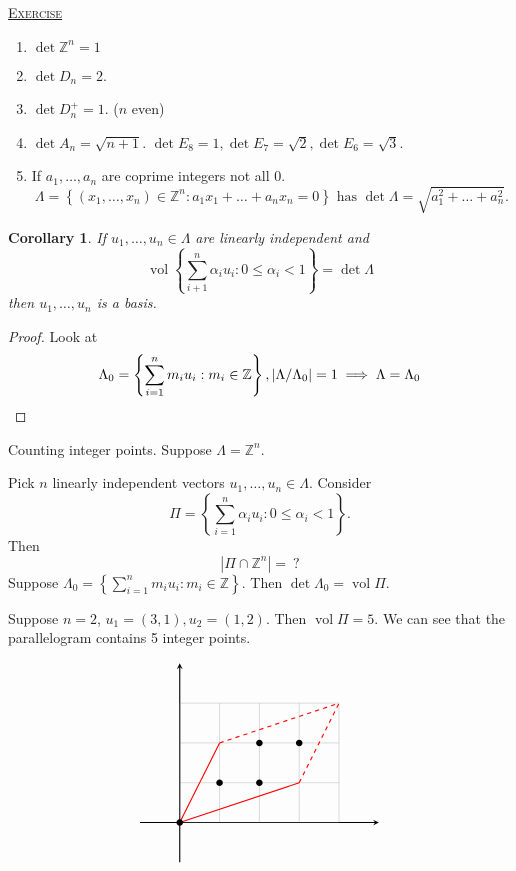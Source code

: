 \documentclass{report}
\newcommand{\Z}{\mathbb{Z}}
\newcommand{\vol}{\operatorname{vol}}
\newcommand{\set}[1]{\left\{ #1 \right\}}
\newcommand{\fancyem}[1]{\underline{\textsc{#1}}}
\newtheorem{corollary}{Corollary}[section]
\theoremstyle{definition}
\theoremstyle{remark}
\numberwithin{equation}{section}
\begin{document}
\fancyem{Exercise} \begin{enumerate}
    \item $\det \Z^n = 1$
    \item $\det D_n = 2$.
    \item $\det D^+_n = 1$. ($n$ even)
    \item $\det A_n = \sqrt{n+1}$. $\det E_8 = 1, \det E_7 = \sqrt{2}, \det E_6 = \sqrt{3}$.
    \item If $a_1, \ldots, a_n$ are coprime integers not all $0$. \[\Lambda = \set{(x_1, \ldots, x_n) \in \Z^n: a_1x_1 + \ldots + a_nx_n = 0} \text{ has } \det \Lambda = \sqrt{a_1^2 + \ldots + a_n^2}.\] 
\end{enumerate}

\begin{corollary}
    If $u_1, \ldots, u_n \in \Lambda$ are linearly independent and \[\vol \set{\sum_{i+1}^n \alpha_iu_i: 0 \leq \alpha_i < 1} = \det \Lambda\] then $u_1, \ldots, u_n$ is a basis.
\end{corollary}
\begin{proof}
    Look at \[\Lambda_0 = \set{\sum_{i=1}^n m_iu_i: m_i \in \Z}, |\Lambda/\Lambda_0| = 1 \implies \Lambda = \Lambda_0 \qedhere\]
\end{proof}

Counting integer points. Suppose $\Lambda = \Z^n$.

Pick $n$ linearly independent vectors $u_1, \ldots, u_n \in \Lambda$. Consider \[\Pi = \set{\sum_{i=1}^n \alpha_iu_i: 0 \leq \alpha_i < 1}.\] Then \[
    |\Pi \cap \Z^n| =\ ?    
\]
Suppose $\Lambda_0 = \set{\sum_{i=1}^n m_iu_i: m_i \in \Z}$. Then $\det \Lambda_0 = \vol \Pi$.

Suppose $n = 2$, $u_1 = (3, 1), u_2 = (1, 2)$. Then $\vol \Pi = 5$. We can see that the  parallelogram contains 5 integer points.

\[
\begin{tikzpicture}
    \draw[thick, -stealth](-1,0) -> (xyz cs:x=5);
    \draw[thick, -stealth](0,-1) -> (xyz cs:y=4);
    \draw[step=1cm,gray,very thin] (0,0) grid (4, 3);
    \draw[red, thick] (0, 0) -- (1, 2);
    \draw[red, thick] (0, 0) -- (3, 1);
    \draw[red, thick, dashed] (1, 2) -- (4, 3);
    \draw[red, thick, dashed] (3, 1) -- (4, 3);
    \node[shape=circle, fill=black, scale = 0.5] () at (0, 0) {};
    \node[shape=circle, fill=black, scale = 0.5] () at (1, 1) {};
    \node[shape=circle, fill=black, scale = 0.5] () at (2, 1) {};
    \node[shape=circle, fill=black, scale = 0.5] () at (2, 2) {};
    \node[shape=circle, fill=black, scale = 0.5] () at (3, 2) {};
\end{tikzpicture}    
\]
\end{document}
